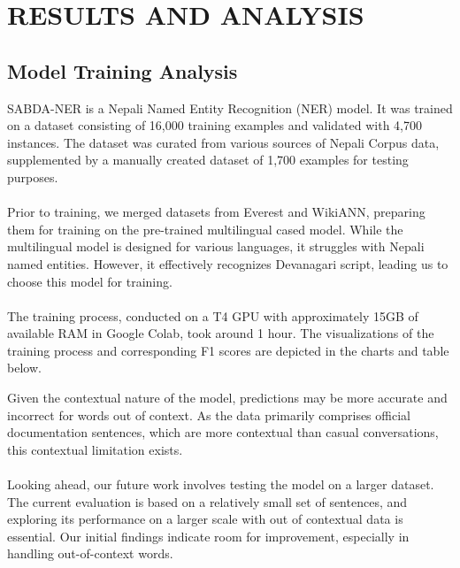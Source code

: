 






\chapter{RESULTS AND ANALYSIS}

\section{Model Training Analysis}
\vspace{10pt} %
SABDA-NER is a Nepali Named Entity Recognition (NER) model. It was trained on a dataset consisting of 16,000 training examples and validated with 4,700 instances. The dataset was curated from various sources of Nepali Corpus data, supplemented by a manually created dataset of 1,700 examples for testing purposes.\\
\\
Prior to training, we merged datasets from Everest and WikiANN, preparing them for training on the pre-trained multilingual cased model. While the multilingual model is designed for various languages, it struggles with Nepali named entities. However, it effectively recognizes Devanagari script, leading us to choose this model for training.\\
\\
The training process, conducted on a T4 GPU with approximately 15GB of available RAM in Google Colab, took around 1 hour. The visualizations of the training process and corresponding F1 scores are depicted in the charts and table below.


 
Given the contextual nature of the model, predictions may be more accurate and incorrect for words out of context. As the data primarily comprises official documentation sentences, which are more contextual than casual conversations, this contextual limitation exists. \\
\\
Looking ahead, our future work involves testing the model on a larger dataset. The current evaluation is based on a relatively small set of sentences, and exploring its performance on a larger scale with out of contextual data is essential. Our initial findings indicate room for improvement, especially in handling out-of-context words.
\newpage
